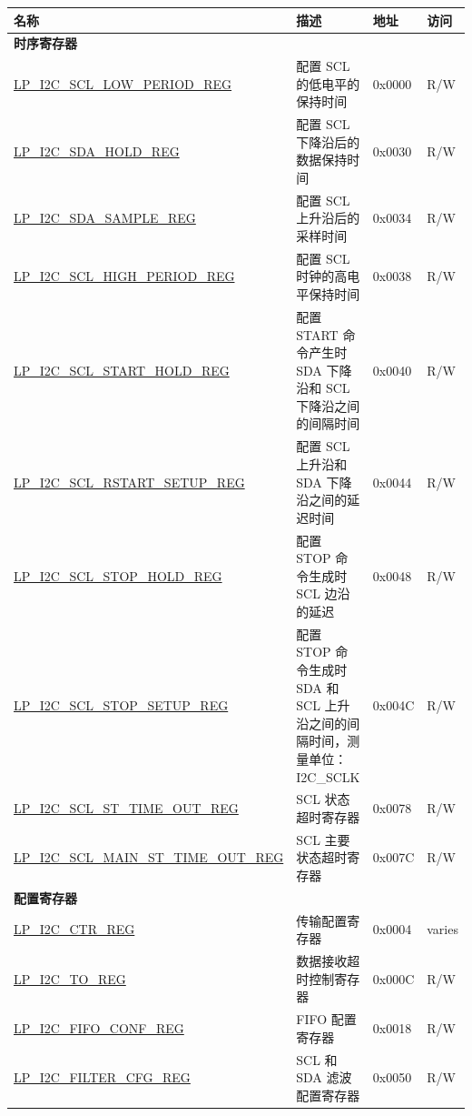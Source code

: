 \begin{longtable}{ | p{6.1cm} | p{7cm} | p{1.3cm} | p{1cm} | }
\hline\rowcolor{lightgray}
名称 & 描述 &  地址 & 访问 \\ \hline
\endhead
\multicolumn{4}{|l|}{\textbf{时序寄存器}} \\ \hline
\hyperref[regdesc:LPI2CSCLLOWPERIODREG]{LP\_I2C\_SCL\_LOW\_PERIOD\_REG} & 配置 SCL 的低电平的保持时间 & 0x0000 & R/W \\ \hline
\hyperref[regdesc:LPI2CSDAHOLDREG]{LP\_I2C\_SDA\_HOLD\_REG} & 配置 SCL 下降沿后的数据保持时间 & 0x0030 & R/W \\ \hline
\hyperref[regdesc:LPI2CSDASAMPLEREG]{LP\_I2C\_SDA\_SAMPLE\_REG} & 配置 SCL 上升沿后的采样时间 & 0x0034 & R/W \\ \hline
\hyperref[regdesc:LPI2CSCLHIGHPERIODREG]{LP\_I2C\_SCL\_HIGH\_PERIOD\_REG} & 配置 SCL 时钟的高电平保持时间 & 0x0038 & R/W \\ \hline
\hyperref[regdesc:LPI2CSCLSTARTHOLDREG]{LP\_I2C\_SCL\_START\_HOLD\_REG} & 配置 START 命令产生时 SDA 下降沿和 SCL 下降沿之间的间隔时间 & 0x0040 & R/W \\ \hline
\hyperref[regdesc:LPI2CSCLRSTARTSETUPREG]{LP\_I2C\_SCL\_RSTART\_SETUP\_REG} & 配置 SCL 上升沿和 SDA 下降沿之间的延迟时间 & 0x0044 & R/W \\ \hline
\hyperref[regdesc:LPI2CSCLSTOPHOLDREG]{LP\_I2C\_SCL\_STOP\_HOLD\_REG} & 配置 STOP 命令生成时 SCL 边沿的延迟 & 0x0048 & R/W \\ \hline
\hyperref[regdesc:LPI2CSCLSTOPSETUPREG]{LP\_I2C\_SCL\_STOP\_SETUP\_REG} & 配置 STOP 命令生成时 SDA 和 SCL 上升沿之间的间隔时间，测量单位：I2C\_SCLK & 0x004C & R/W \\ \hline
\hyperref[regdesc:LPI2CSCLSTTIMEOUTREG]{LP\_I2C\_SCL\_ST\_TIME\_OUT\_REG} & SCL 状态超时寄存器 & 0x0078 & R/W \\ \hline
\hyperref[regdesc:LPI2CSCLMAINSTTIMEOUTREG]{LP\_I2C\_SCL\_MAIN\_ST\_TIME\_OUT\_REG} & SCL 主要状态超时寄存器 & 0x007C & R/W \\ \hline
\multicolumn{4}{|l|}{\textbf{配置寄存器}} \\ \hline
\hyperref[regdesc:LPI2CCTRREG]{LP\_I2C\_CTR\_REG} & 传输配置寄存器 & 0x0004 & varies \\ \hline
\hyperref[regdesc:LPI2CTOREG]{LP\_I2C\_TO\_REG} & 数据接收超时控制寄存器 & 0x000C & R/W \\ \hline
\hyperref[regdesc:LPI2CFIFOCONFREG]{LP\_I2C\_FIFO\_CONF\_REG} & FIFO 配置寄存器 & 0x0018 & R/W \\ \hline
\hyperref[regdesc:LPI2CFILTERCFGREG]{LP\_I2C\_FILTER\_CFG\_REG} & SCL 和 SDA 滤波配置寄存器 & 0x0050 & R/W \\ \hline

\end{longtable}
